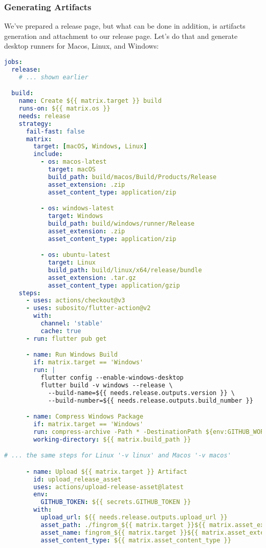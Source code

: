 \subsubsection{Generating Artifacts}

We've prepared a release page, but what can be done in addition, is artifacts generation and attachment to our release
page. Let's do that and generate desktop runners for Macos, Linux, and Windows:

\begin{lstlisting}[language=yaml]
jobs:
  release: 
    # ... shown earlier

  build:
    name: Create ${{ matrix.target }} build
    runs-on: ${{ matrix.os }}
    needs: release
    strategy:
      fail-fast: false
      matrix:
        target: [macOS, Windows, Linux]
        include:
          - os: macos-latest
            target: macOS
            build_path: build/macos/Build/Products/Release
            asset_extension: .zip
            asset_content_type: application/zip

          - os: windows-latest
            target: Windows
            build_path: build/windows/runner/Release
            asset_extension: .zip
            asset_content_type: application/zip

          - os: ubuntu-latest
            target: Linux
            build_path: build/linux/x64/release/bundle
            asset_extension: .tar.gz
            asset_content_type: application/gzip
    steps:
      - uses: actions/checkout@v3
      - uses: subosito/flutter-action@v2
        with:
          channel: 'stable'
          cache: true
      - run: flutter pub get

      - name: Run Windows Build 
        if: matrix.target == 'Windows'
        run: |
          flutter config --enable-windows-desktop
          flutter build -v windows --release \
            --build-name=${{ needs.release.outputs.version }} \
            --build-number=${{ needs.release.outputs.build_number }}

      - name: Compress Windows Package
        if: matrix.target == 'Windows'
        run: compress-archive -Path * -DestinationPath ${env:GITHUB_WORKSPACE}/fingrom_${{ matrix.target }}${{ matrix.asset_extension }}
        working-directory: ${{ matrix.build_path }}

# ... the same steps for Linux '-v linux' and Macos '-v macos'

      - name: Upload ${{ matrix.target }} Artifact
        id: upload_release_asset
        uses: actions/upload-release-asset@latest
        env:
          GITHUB_TOKEN: ${{ secrets.GITHUB_TOKEN }}
        with:
          upload_url: ${{ needs.release.outputs.upload_url }}
          asset_path: ./fingrom_${{ matrix.target }}${{ matrix.asset_extension }}
          asset_name: fingrom_${{ matrix.target }}${{ matrix.asset_extension }}
          asset_content_type: ${{ matrix.asset_content_type }}
\end{lstlisting}

